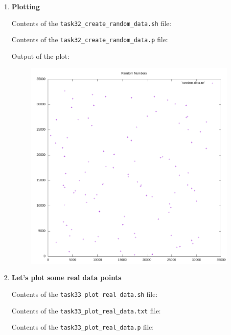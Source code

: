 \documentclass[9pt]{article}
\begin{document}
\begin{enumerate}
	\item \textbf{Plotting}
	
		Contents of the \texttt{task32\_create\_random\_data.sh} file:

		Contents of the \texttt{task32\_create\_random\_data.p} file:
		
		\newpage
		Output of the plot:
		\begin{figure}[h!]
			\centering
			\includegraphics[width=14cm]{../task32_create_random_data}
		\end{figure}

	\item \textbf{Let's plot some real data points}

		Contents of the \texttt{task33\_plot\_real\_data.sh} file:

		Contents of the \texttt{task33\_plot\_real\_data.txt} file:

		Contents of the \texttt{task33\_plot\_real\_data.p} file:
		

\end{enumerate}
\end{document}
